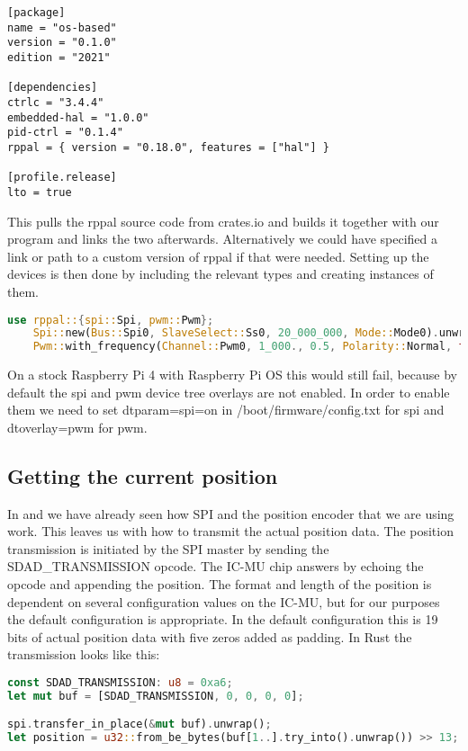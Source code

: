 \begin{verbatim}
[package]
name = "os-based"
version = "0.1.0"
edition = "2021"

[dependencies]
ctrlc = "3.4.4"
embedded-hal = "1.0.0"
pid-ctrl = "0.1.4"
rppal = { version = "0.18.0", features = ["hal"] }

[profile.release]
lto = true
\end{verbatim}

This pulls the rppal source code from crates.io and builds it together with our program and links the two afterwards.
Alternatively we could have specified a link or path to a custom version of rppal if that were needed.
Setting up the devices is then done by including the relevant types and creating instances of them.

\begin{lstlisting}[language=Rust,style=colouredRust]
    use rppal::{spi::Spi, pwm::Pwm};
    Spi::new(Bus::Spi0, SlaveSelect::Ss0, 20_000_000, Mode::Mode0).unwrap();
    Pwm::with_frequency(Channel::Pwm0, 1_000., 0.5, Polarity::Normal, false).unwrap();
\end{lstlisting}

On a stock Raspberry Pi 4 with Raspberry Pi OS this would still fail, because by default the spi and pwm device tree overlays are not enabled.
In order to enable them we need to set dtparam=spi=on in /boot/firmware/config.txt for spi and dtoverlay=pwm for pwm.

\subsection{Getting the current position}

In  and  we have already seen how SPI and the position encoder that we are using work.
This leaves us with how to transmit the actual position data.
The position transmission is initiated by the SPI master by sending the SDAD\_TRANSMISSION opcode.
The IC-MU chip answers by echoing the opcode and appending the position.
The format and length of the position is dependent on several configuration values on the IC-MU, but for our purposes the default configuration is appropriate.
In the default configuration this is 19 bits of actual position data with five zeros added as padding.
In Rust the transmission looks like this:

\begin{lstlisting}[language=Rust,style=colouredRust]
const SDAD_TRANSMISSION: u8 = 0xa6;
let mut buf = [SDAD_TRANSMISSION, 0, 0, 0, 0];

spi.transfer_in_place(&mut buf).unwrap();
let position = u32::from_be_bytes(buf[1..].try_into().unwrap()) >> 13;
\end{lstlisting}

